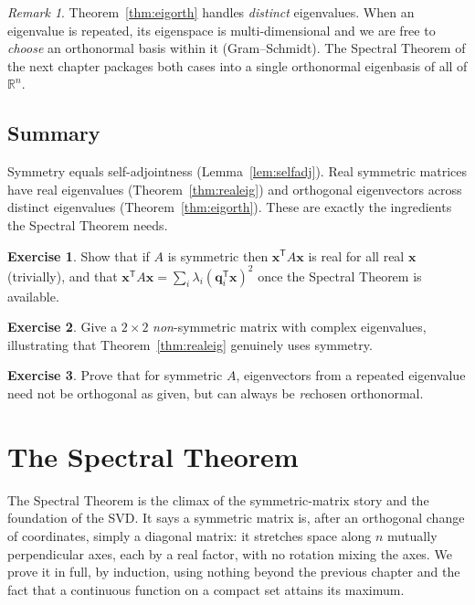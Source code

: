 \documentclass[11pt,oneside]{book}
\theoremstyle{plain}
\theoremstyle{definition}
\newtheorem{exercise}{Exercise}[chapter]
\theoremstyle{remark}
\newtheorem{remark}[theorem]{Remark}
\newcommand{\R}{\mathbb{R}}
\newcommand{\T}{^{\mathsf T}}
\newcommand{\bx}{\mathbf{x}}
\newcommand{\bq}{\mathbf{q}}
\begin{document}
\begin{remark}
Theorem~\ref{thm:eigorth} handles \emph{distinct} eigenvalues. When an eigenvalue is
repeated, its eigenspace is multi-dimensional and we are free to \emph{choose} an
orthonormal basis within it (Gram--Schmidt). The Spectral Theorem of the next chapter
packages both cases into a single orthonormal eigenbasis of all of $\R^n$.
\end{remark}

\section*{Summary}
Symmetry equals self-adjointness (Lemma~\ref{lem:selfadj}). Real symmetric matrices have
real eigenvalues (Theorem~\ref{thm:realeig}) and orthogonal eigenvectors across distinct
eigenvalues (Theorem~\ref{thm:eigorth}). These are exactly the ingredients the Spectral
Theorem needs.

\begin{exercise}
Show that if $A$ is symmetric then $\bx\T A\bx$ is real for all real $\bx$ (trivially),
and that $\bx\T A\bx=\sum_{i}\lambda_i(\bq_i\T\bx)^2$ once the Spectral Theorem is
available.
\end{exercise}
\begin{exercise}
Give a $2\times2$ \emph{non}-symmetric matrix with complex eigenvalues, illustrating that
Theorem~\ref{thm:realeig} genuinely uses symmetry.
\end{exercise}
\begin{exercise}
Prove that for symmetric $A$, eigenvectors from a repeated eigenvalue need not be
orthogonal as given, but can always be \emph{re}chosen orthonormal.
\end{exercise}

\chapter{The Spectral Theorem}\label{ch:spectral}

\begin{intuition_box}
The Spectral Theorem is the climax of the symmetric-matrix story and the foundation of
the SVD. It says a symmetric matrix is, after an orthogonal change of coordinates, simply
a diagonal matrix: it stretches space along $n$ mutually perpendicular axes, each by a
real factor, with no rotation mixing the axes. We prove it in full, by induction, using
nothing beyond the previous chapter and the fact that a continuous function on a compact
set attains its maximum.
\end{intuition_box}
\end{document}
